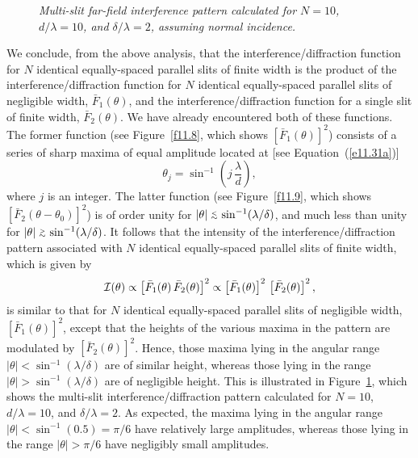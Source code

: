 \begin{figure}
\epsfysize=2.5in
\centerline{}
\caption{\em Multi-slit  far-field interference pattern calculated for $N=10$, $d/\lambda = 10$, and $\delta/\lambda=2$,  assuming normal
incidence.}\label{f11.11}   
\end{figure}

We conclude, from the above analysis, that the interference/diffraction function for $N$ identical equally-spaced parallel slits of
finite width is the product of the interference/diffraction function for $N$ identical equally-spac\-ed parallel slits of
negligible width, $\bar{F}_1(\theta)$,  and the interference/diffraction function for a single slit of finite width, $\bar{F}_2(\theta)$. 
We have already encountered both of these  functions. The former function (see Figure~\ref{f11.8}, which shows
$[\bar{F}_1(\theta)]^2$) consists of a series of sharp maxima of equal amplitude located
at [see Equation~(\ref{e11.31a})]
\begin{equation}
\theta_j = \sin^{-1}\left(j\,\frac{\lambda}{d}\right),
\end{equation}
where $j$ is an integer. The latter function (see Figure~\ref{f11.9}, which shows $[\bar{F}_2(\theta-\theta_0)]^2$) is of order unity for $|\theta|\stackrel {_{\normalsize<}}{_{\normalsize \sim}} \sin^{-1}(\lambda/\delta)$, and much less than unity for $|\theta|\stackrel {_{\normalsize>}}{_{\normalsize \sim}} \sin^{-1}(\lambda/\delta)$. 
It follows that the intensity of the interference/diffraction pattern associated with $N$ identical equally-spaced parallel slits of finite width, which is given by
\begin{equation}
{\cal I}(\theta) \propto \left[\bar{F}_1(\theta)\,\bar{F}_2(\theta)\right]^2\propto\left[\bar{F}_1(\theta)\right]^2\, \left[\bar{F}_2(\theta)\right]^2,
\end{equation}
is similar to that for $N$ identical equally-spaced parallel slits of negligible  width, $[\bar{F}_1(\theta)]^2$, except that the heights of the various maxima in the pattern are
modulated by $[\bar{F}_2(\theta)]^2$. 
Hence, those maxima lying in the angular range $|\theta|< \sin^{-1}(\lambda/\delta)$ are of similar height, whereas those lying in the range $|\theta|> \sin^{-1}(\lambda/\delta)$ are of negligible height. This is illustrated in Figure~\ref{f11.11}, which shows the multi-slit interference/diffraction
pattern calculated for $N=10$, $d/\lambda =10$, and $\delta/\lambda = 2$. As expected, the maxima lying 
in the angular range $|\theta|< \sin^{-1}(0.5) = \pi/6$ have relatively large
amplitudes, whereas those lying in the 
range $|\theta|> \pi/6$ have negligibly  small amplitudes. 

